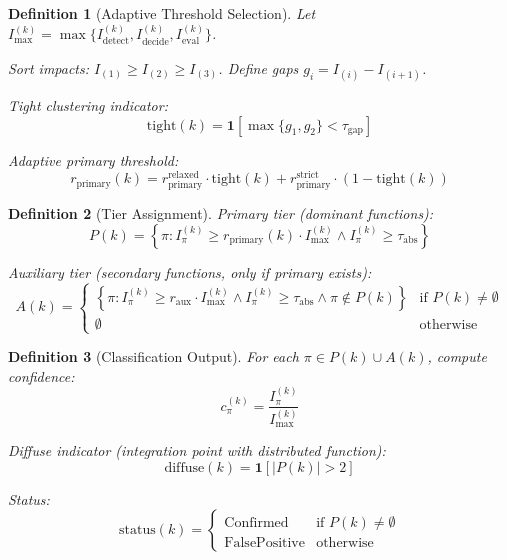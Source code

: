 \documentclass[11pt]{article}
\newtheorem{definition}{Definition}[section]
\begin{document}
\begin{definition}[Adaptive Threshold Selection]
\label{def:adaptive-threshold-selection}
Let $I_{\max}^{(k)} = \max\{I^{(k)}_{\text{detect}}, I^{(k)}_{\text{decide}}, I^{(k)}_{\text{eval}}\}$.

Sort impacts: $I_{(1)} \geq I_{(2)} \geq I_{(3)}$. Define gaps $g_i = I_{(i)} - I_{(i+1)}$.

Tight clustering indicator:
\begin{equation}
\text{tight}(k) = \mathbf{1}[\max\{g_1, g_2\} < \tau_{\text{gap}}]
\end{equation}

Adaptive primary threshold:
\begin{equation}
r_{\text{primary}}(k) = r_{\text{primary}}^{\text{relaxed}} \cdot \text{tight}(k) + r_{\text{primary}}^{\text{strict}} \cdot (1 - \text{tight}(k))
\end{equation}
\end{definition}

\begin{definition}[Tier Assignment]
\label{def:tier-assignment}
Primary tier (dominant functions):
\begin{equation}
P(k) = \left\{\pi : I^{(k)}_\pi \geq r_{\text{primary}}(k) \cdot I_{\max}^{(k)} \land I^{(k)}_\pi \geq \tau_{\text{abs}}\right\}
\end{equation}

Auxiliary tier (secondary functions, only if primary exists):
\begin{equation}
A(k) = \begin{cases}
\left\{\pi : I^{(k)}_\pi \geq r_{\text{aux}} \cdot I_{\max}^{(k)} \land I^{(k)}_\pi \geq \tau_{\text{abs}} \land \pi \notin P(k)\right\} & \text{if } P(k) \neq \emptyset \\
\emptyset & \text{otherwise}
\end{cases}
\end{equation}
\end{definition}

\begin{definition}[Classification Output]
\label{def:classification-output}
For each $\pi \in P(k) \cup A(k)$, compute confidence:
\begin{equation}
c^{(k)}_\pi = \frac{I^{(k)}_\pi}{I_{\max}^{(k)}}
\end{equation}

Diffuse indicator (integration point with distributed function):
\begin{equation}
\text{diffuse}(k) = \mathbf{1}[|P(k)| > 2]
\end{equation}

Status:
\begin{equation}
\text{status}(k) = \begin{cases}
\text{Confirmed} & \text{if } P(k) \neq \emptyset \\
\text{FalsePositive} & \text{otherwise}
\end{cases}
\end{equation}
\end{definition}
\end{document}

